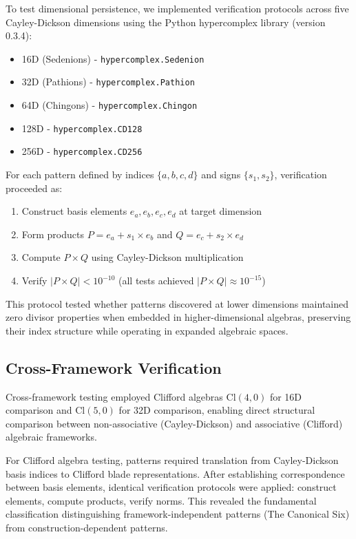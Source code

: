 \documentclass[11pt]{article}
\begin{document}
To test dimensional persistence, we implemented verification protocols across five Cayley-Dickson dimensions using the Python hypercomplex library (version 0.3.4):

\begin{itemize}
\item 16D (Sedenions) - \texttt{hypercomplex.Sedenion}
\item 32D (Pathions) - \texttt{hypercomplex.Pathion}
\item 64D (Chingons) - \texttt{hypercomplex.Chingon}
\item 128D - \texttt{hypercomplex.CD128}
\item 256D - \texttt{hypercomplex.CD256}
\end{itemize}

For each pattern defined by indices $\{a,b,c,d\}$ and signs $\{s_1,s_2\}$, verification proceeded as:

\begin{enumerate}
\item Construct basis elements $e_a, e_b, e_c, e_d$ at target dimension
\item Form products $P = e_a + s_1 \times e_b$ and $Q = e_c + s_2 \times e_d$
\item Compute $P \times Q$ using Cayley-Dickson multiplication
\item Verify $|P \times Q| < 10^{-10}$ (all tests achieved $|P \times Q| \approx 10^{-15}$)
\end{enumerate}

This protocol tested whether patterns discovered at lower dimensions maintained zero divisor properties when embedded in higher-dimensional algebras, preserving their index structure while operating in expanded algebraic spaces.

\subsection{Cross-Framework Verification}

Cross-framework testing employed Clifford algebras $\text{Cl}(4,0)$ for 16D comparison and $\text{Cl}(5,0)$ for 32D comparison, enabling direct structural comparison between non-associative (Cayley-Dickson) and associative (Clifford) algebraic frameworks.

For Clifford algebra testing, patterns required translation from Cayley-Dickson basis indices to Clifford blade representations. After establishing correspondence between basis elements, identical verification protocols were applied: construct elements, compute products, verify norms. This revealed the fundamental classification distinguishing framework-independent patterns (The Canonical Six) from construction-dependent patterns.
\end{document}
